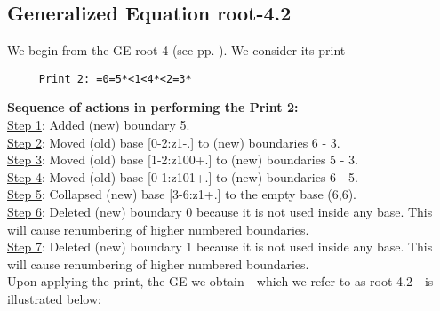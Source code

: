 \documentclass[final]{article}
\begin{document}
\subsection*{Generalized Equation root-4.2}
\label{root-4.2}We begin from the GE root-4 (see pp. \pageref{root-4}).  {We consider its print}
\begin{verbatim}
     Print 2: =0=5*<1<4*<2=3*
\end{verbatim}
{\bf Sequence of actions in performing the Print 2:}\\
{\underline{Step 1}:} Added (new) boundary 5.\\
{\underline{Step 2}:} Moved (old) base [0-2:z1-.]  to (new) boundaries 6 - 3.\\
{\underline{Step 3}:} Moved (old) base [1-2:z100+.]  to (new) boundaries 5 - 3.\\
{\underline{Step 4}:} Moved (old) base [0-1:z101+.]  to (new) boundaries 6 - 5.\\
{\underline{Step 5}:} Collapsed (new) base [3-6:z1+.]  to the empty base (6,6).
\\
{\underline{Step 6}:} Deleted (new) boundary 0 because it is not used inside any base.  This will cause renumbering of higher numbered boundaries.
\\
{\underline{Step 7}:} Deleted (new) boundary 1 because it is not used inside any base.  This will cause renumbering of higher numbered boundaries.
\\[0.1in]
{Upon applying the print, the GE we obtain---which we refer to as root-4.2---is illustrated below:}
\end{document}
